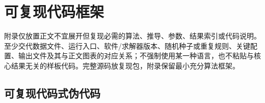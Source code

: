 \section{可复现代码框架}

附录仅放置正文不宜展开但复现必需的算法、推导、参数、结果索引或代码说明。至少交代数据文件、运行入口、软件/求解器版本、随机种子或重复规则、关键配置、输出文件及其与正文图表的对应关系；不强制使用某一种语言，也不粘贴与核心结果无关的样板代码。完整源码放复现包，附录保留最小充分算法框架。

\subsection{可复现代码式伪代码}

